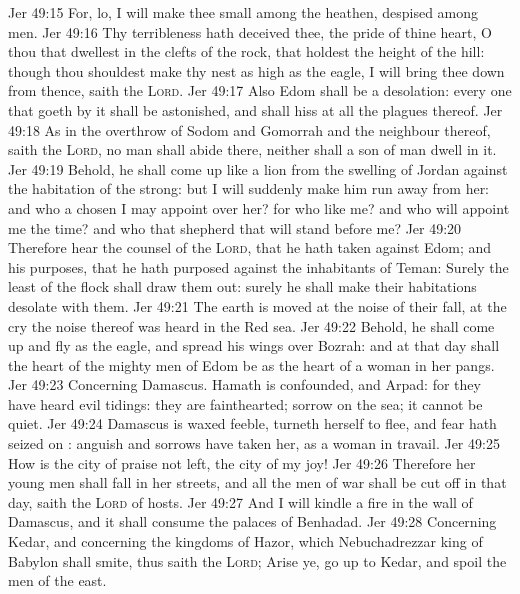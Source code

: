 \vs Jer 49:15 For, lo, I will make thee small among the heathen,  despised among men.
\vs Jer 49:16 Thy terribleness hath deceived thee,  the pride of thine heart, O thou that dwellest in the clefts of the rock, that holdest the height of the hill: though thou shouldest make thy nest as high as the eagle, I will bring thee down from thence, saith the \textsc{Lord}.
\vs Jer 49:17 Also Edom shall be a desolation: every one that goeth by it shall be astonished, and shall hiss at all the plagues thereof.
\vs Jer 49:18 As in the overthrow of Sodom and Gomorrah and the neighbour  thereof, saith the \textsc{Lord}, no man shall abide there, neither shall a son of man dwell in it.
\vs Jer 49:19 Behold, he shall come up like a lion from the swelling of Jordan against the habitation of the strong: but I will suddenly make him run away from her: and who  a chosen  I may appoint over her? for who  like me? and who will appoint me the time? and who  that shepherd that will stand before me?
\vs Jer 49:20 Therefore hear the counsel of the \textsc{Lord}, that he hath taken against Edom; and his purposes, that he hath purposed against the inhabitants of Teman: Surely the least of the flock shall draw them out: surely he shall make their habitations desolate with them.
\vs Jer 49:21 The earth is moved at the noise of their fall, at the cry the noise thereof was heard in the Red sea.
\vs Jer 49:22 Behold, he shall come up and fly as the eagle, and spread his wings over Bozrah: and at that day shall the heart of the mighty men of Edom be as the heart of a woman in her pangs.
\vs Jer 49:23 Concerning Damascus. Hamath is confounded, and Arpad: for they have heard evil tidings: they are fainthearted;  sorrow on the sea; it cannot be quiet.
\vs Jer 49:24 Damascus is waxed feeble,  turneth herself to flee, and fear hath seized on : anguish and sorrows have taken her, as a woman in travail.
\vs Jer 49:25 How is the city of praise not left, the city of my joy!
\vs Jer 49:26 Therefore her young men shall fall in her streets, and all the men of war shall be cut off in that day, saith the \textsc{Lord} of hosts.
\vs Jer 49:27 And I will kindle a fire in the wall of Damascus, and it shall consume the palaces of Benhadad.
\vs Jer 49:28 Concerning Kedar, and concerning the kingdoms of Hazor, which Nebuchadrezzar king of Babylon shall smite, thus saith the \textsc{Lord}; Arise ye, go up to Kedar, and spoil the men of the east.
